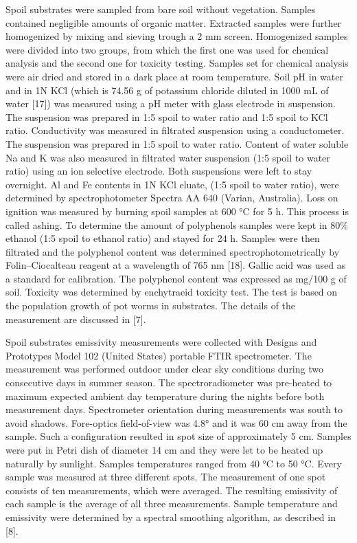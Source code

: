Spoil substrates were sampled from bare soil without vegetation. Samples contained negligible amounts of organic matter. Extracted samples were further homogenized by mixing and sieving trough a 2 mm screen. Homogenized samples were divided into two groups, from which the first one was used for chemical analysis and the second one for toxicity testing. Samples set for chemical analysis were air dried and stored in a dark place at room temperature. Soil pH in water and in 1N KCl (which is 74.56 g of potassium chloride diluted in 1000 mL of water [17]) was measured using a pH meter with glass electrode in suspension. The suspension was prepared in 1:5 spoil to water ratio and 1:5 spoil to KCl ratio. Conductivity was measured in filtrated suspension using a conductometer. The suspension was prepared in 1:5 spoil to water ratio. Content of water soluble Na and K was also measured in filtrated water suspension (1:5 spoil to water ratio) using an ion selective electrode. Both suspensions were left to stay overnight. Al and Fe contents in 1N KCl eluate, (1:5 spoil to water ratio), were determined by spectrophotometer Spectra AA 640 (Varian, Australia). Loss on ignition was measured by burning spoil samples at 600 °C for 5 h. This process is called ashing. To determine the amount of polyphenols samples were kept in 80\% ethanol (1:5 spoil to ethanol ratio) and stayed for 24 h. Samples were then filtrated and the polyphenol content was determined spectrophotometrically by Folin–Ciocalteau reagent at a wavelength of 765 nm [18]. Gallic acid was used as a standard for calibration. The polyphenol content was expressed as mg/100 g of soil. Toxicity was determined by enchytraeid toxicity test. The test is based on the population growth of pot worms in substrates. The details of the measurement are discussed in [7].

Spoil substrates emissivity measurements were collected with Designs and Prototypes Model 102 (United States) portable FTIR spectrometer. The measurement was performed outdoor under clear sky conditions during two consecutive days in summer season. The spectroradiometer was pre-heated to maximum expected ambient day temperature during the nights before both measurement days. Spectrometer orientation during measurements was south to avoid shadows. Fore-optics field-of-view was 4.8° and it was 60 cm away from the sample. Such a configuration resulted in spot size of approximately 5 cm. Samples were put in Petri dish of diameter 14 cm and they were let to be heated up naturally by sunlight. Samples temperatures ranged from 40 °C to 50 °C. Every sample was measured at three different spots. The measurement of one spot consists of ten measurements, which were averaged. The resulting emissivity of each sample is the average of all three measurements. Sample temperature and emissivity were determined by a spectral smoothing algorithm, as described in [8].

